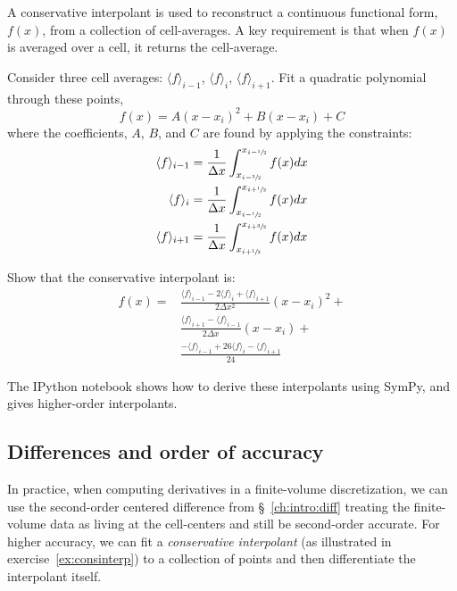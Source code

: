 \begin{exercise}
{\label{ex:consinterp} A conservative interpolant is used to reconstruct a continuous
  functional form, $f(x)$, from a collection of cell-averages.  A key
  requirement is that when $f(x)$ is averaged over a cell, it returns
  the cell-average.

Consider three cell averages: $\langle f \rangle_{i-1}$, $\langle f \rangle_{i}$, $\langle f \rangle_{i+1}$.  Fit a quadratic polynomial through these points,
 \begin{equation}
 f(x) = A (x - x_i)^2 + B (x - x_i) + C
 \end{equation}
 where the coefficients, $A$, $B$, and $C$ are found by applying the constraints:
 \begin{align}
 \langle f\rangle_{i-1} &= \frac{1}{\Delta x}
      \int_{x_{i-\sfrac{3}{2}}}^{x_{i-\sfrac{1}{2}}} f(x) dx \\
 \langle f\rangle_{i} &= \frac{1}{\Delta x}
      \int_{x_{i-\sfrac{1}{2}}}^{x_{i+\sfrac{1}{2}}} f(x) dx \\
 \langle f\rangle_{i+1} &= \frac{1}{\Delta x}
      \int_{x_{i+\sfrac{1}{2}}}^{x_{i+\sfrac{3}{2}}} f(x) dx
 \end{align}

Show that the conservative interpolant is:
\begin{align}
f(x) = &\frac{\langle f\rangle_{i-1} - 2 \langle f\rangle_i +
             \langle f\rangle_{i+1}}{2\Delta x^2} (x-x_i)^2 + \nonumber \\
       &\frac{\langle f\rangle_{i+1} - \langle f\rangle_{i-1}}
            {2\Delta x} (x-x_i) + \nonumber \\
       &\frac{-\langle f\rangle_{i-1} + 26 \langle f\rangle_i
             -\langle f\rangle_{i+1}}{24}
\end{align}
}
\end{exercise}

The {\sf IPython} notebook
shows how to derive these interpolants using {\sf SymPy}, and gives
higher-order interpolants.


\subsection{Differences and order of accuracy}

In practice, when computing derivatives in a finite-volume
discretization, we can use the second-order centered difference from
\S~\ref{ch:intro:diff} treating the finite-volume data as living at the
cell-centers and still be second-order accurate.  For higher accuracy,
we can fit a {\em conservative interpolant} (as illustrated in
exercise~\ref{ex:consinterp}) to a collection of points and then
differentiate the interpolant itself.  


